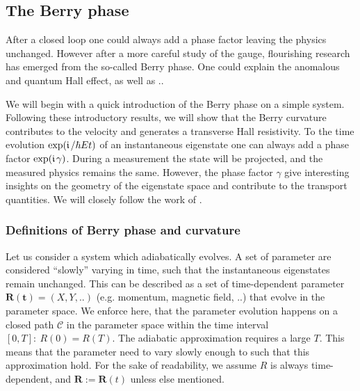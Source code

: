 \documentclass[../main]{subfiles}
\begin{document}
    \subsection{The Berry phase}
    After a closed loop one could always add a phase factor leaving the physics unchanged. However after a more careful study of the gauge,
    flourishing research has emerged from the so-called Berry phase. One could explain the anomalous and quantum Hall effect, as well as ..

    We will begin with a quick introduction of the Berry phase on a simple system. Following these introductory results, we will show that the 
    Berry curvature contributes to the velocity and generates a transverse Hall resistivity. 
    To the time evolution $\exp(\large\mathfrak{i}\hspace*{1.3pt}\normalsize / \hbar E t)$ of an instantaneous eigenstate one can always add a phase factor $\exp(\large\mathfrak{i}\hspace*{1.3pt}\normalsize \gamma)$. During a measurement
    the state will be projected, and the measured physics remains the same. However, the phase factor $\gamma$ give interesting insights on the geometry
    of the eigenstate space and contribute to the transport quantities. 
    We will closely follow the work of \cite{Xiao2010-lt, Berry1984-gt}.

    \subsubsection{Definitions of Berry phase and curvature}
    \newcommand{\R}{(\bm{R})}
    Let us consider a system which adiabatically evolves. A set of parameter are considered ``slowly'' varying in time, such that the instantaneous eigenstates remain unchanged.
    This can be described as a set of time-dependent parameter $\bm{R(t)}=(X,Y,..)$ (e.g. momentum, magnetic field, ..) that evolve in the parameter space.
    We enforce here, that the parameter evolution happens on a closed path $\mathcal{C}$ in the parameter space within the time interval $[0,T]:~R(0)=R(T)$.
    The adiabatic approximation requires a large $T$. This means that the parameter need to vary slowly enough to such that this approximation hold. 
    For the sake of readability, we assume $R$ is always time-dependent, and $\bm{R}:=\bm{R}(t)$ 
    unless else mentioned.\newline
\end{document}
